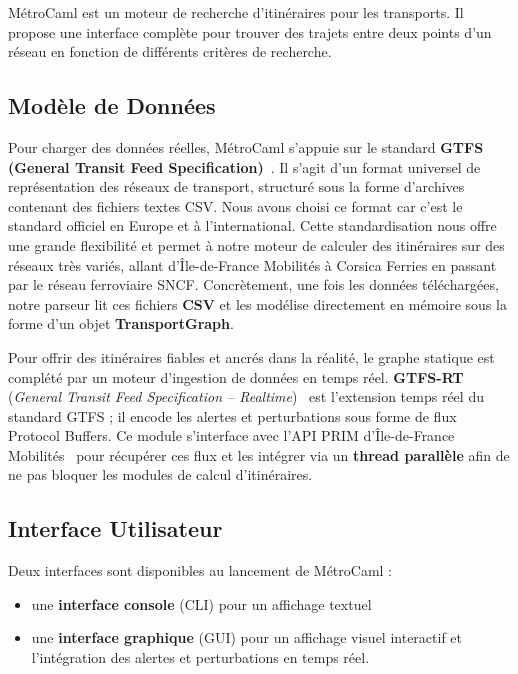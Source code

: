 \documentclass[12pt,a4paper]{article}
\begin{document}
MétroCaml est un moteur de recherche d'itinéraires pour les transports. Il propose une interface complète pour trouver des trajets entre deux points d'un réseau en fonction de différents critères de recherche.

\subsection{Modèle de Données}

Pour charger des données réelles, MétroCaml s'appuie sur le standard \textbf{GTFS (General Transit Feed Specification)}~\cite{gtfs}. Il s'agit d'un format universel de représentation des réseaux de transport, structuré sous la forme d'archives contenant des fichiers textes CSV. Nous avons choisi ce format car c'est le standard officiel en Europe et à l'international. Cette standardisation nous offre une grande flexibilité et permet à notre moteur de calculer des itinéraires sur des réseaux très variés, allant d'Île-de-France Mobilités à Corsica Ferries en passant par le réseau ferroviaire SNCF. Concrètement, une fois les données téléchargées, notre parseur lit ces fichiers \textbf{CSV} et les modélise directement en mémoire sous la forme d'un objet \textbf{TransportGraph}.

Pour offrir des itinéraires fiables et ancrés dans la réalité, le graphe statique est complété par un moteur d'ingestion de données en temps réel. \textbf{GTFS-RT} (\textit{General Transit Feed Specification -- Realtime})~\cite{gtfsrt} est l'extension temps réel du standard GTFS ; il encode les alertes et perturbations sous forme de flux Protocol Buffers. Ce module s'interface avec l'API PRIM d'Île-de-France Mobilités~\cite{prim} pour récupérer ces flux et les intégrer via un \textbf{thread parallèle} afin de ne pas bloquer les modules de calcul d'itinéraires.

\newpage
\subsection{Interface Utilisateur}

Deux interfaces sont disponibles au lancement de MétroCaml :
\begin{itemize}
    \item une \textbf{interface console} (CLI) pour un affichage textuel
    \item une \textbf{interface graphique} (GUI) pour un affichage visuel interactif et l'intégration des alertes et perturbations en temps réel.
\end{itemize}
\end{document}

